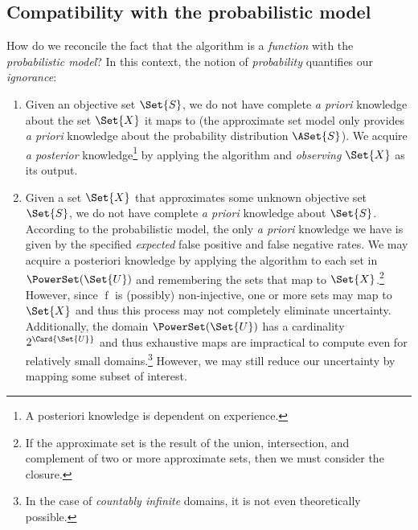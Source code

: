 \documentclass[ ../main.tex]{subfiles}
\begin{document}
\subsection{Compatibility with the probabilistic model}
How do we reconcile the fact that the algorithm is a \emph{function} with the 
\emph{probabilistic model}? In this context, the notion of \emph{probability} 
quantifies our \emph{ignorance}:
\begin{enumerate}
\item Given an objective set $\Set{S}$, we do not have complete \emph{a priori} 
knowledge about the set $\Set{X}$ it maps to (the approximate set model only 
provides \emph{a priori} knowledge about the probability distribution 
$\ASet{S}$). We acquire \emph{a posterior} knowledge\footnote{A posteriori 
knowledge is dependent on experience.} by applying the algorithm and 
\emph{observing} $\Set{X}$ as its output.
\item Given a set $\Set{X}$ that approximates some unknown objective set 
$\Set{S}$, we do not have complete \emph{a priori} knowledge about $\Set{S}$. 
According to the probabilistic model, the only \emph{a priori} knowledge we have 
is given by the specified \emph{expected} false positive and false negative 
rates. We may acquire a posteriori knowledge by applying the algorithm to each 
set in $\PowerSet(\Set{U})$ and remembering the sets that map to 
$\Set{X}$.\footnote{If the approximate set is the result of the union, 
intersection, and complement of two or more approximate sets, then we must 
consider the closure.}
However, since $\operatorname{f}$ is (possibly) non-injective, one or more sets 
may map to $\Set{X}$ and thus this process may not completely eliminate 
uncertainty. Additionally, the domain $\PowerSet(\Set{U})$ has a cardinality
$2^{\Card{\Set{U}}}$ and thus exhaustive maps are impractical to compute even 
for relatively small domains.\footnote{In the case of \emph{countably infinite} 
domains, it is not even theoretically possible.} However, we may still reduce 
our uncertainty by mapping some subset of interest.
\end{enumerate}
\end{document}
